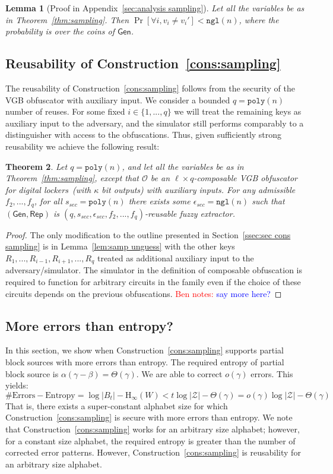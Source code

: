 \documentclass[11pt]{article}
\newcommand{\secref}[1]{\mbox{Section~\ref{#1}}}
\newcommand{\apref}[1]{\mbox{Appendix~\ref{#1}}}
\newcommand{\thref}[1]{\mbox{Theorem~\ref{#1}}}
\newcommand{\lemref}[1]{\mbox{Lemma~\ref{#1}}}
\newcommand{\consref}[1]{\mbox{Construction~\ref{#1}}}
\newcommand{\class}[1]{{\ensuremath{\mathsf{#1}}}}
\newcommand{\gen}{\ensuremath{\class{Gen}}\xspace}
\newcommand{\rep}{\ensuremath{\class{Rep}}\xspace}
\newcommand{\poly}{\ensuremath{\mathtt{poly}}\xspace}
\newcommand{\ngl}{\ensuremath{\mathtt{ngl}}\xspace}
\newcommand{\Hoo}{\mathrm{H}_\infty}
\newtheorem{theorem}{Theorem}[section]
\newtheorem{lemma}[theorem]{Lemma}
\newcommand{\authnote}[2]{{\textcolor{red}{\textsf{#1 notes: }\textcolor{blue}{ #2}}\marginpar{\textcolor{red}{\textbf{!!!!!}}}}}
\newcommand{\authnote}[2]{}
\newcommand{\bnote}[1]{{\authnote{Ben}{#1}}}
\begin{document}
\begin{lemma}[Proof in \apref{sec:analysis sampling}]
\label{lem:sampling errors}
Let all the variables be as in \thref{thm:sampling}.
 Then $\Pr[\forall i, v_i\neq v_i'] < \ngl(n)$, where the probability is over the coins of $\gen$.  
\end{lemma}

\subsection{Reusability of \consref{cons:sampling}}
The reusability of \consref{cons:sampling} follows from the security of the VGB obfuscator with auxiliary input.  We consider a bounded $q = \poly(n)$ number of reuses.  For some fixed $i\in \{1,..., q\}$ we will treat the remaining keys as auxiliary input to the adversary, and the simulator still performs comparably to a distinguisher with access to the obfuscations.  Thus, given sufficiently strong reusability we achieve the following result:

\begin{theorem}
\label{thm:reusability}
Let $q = \poly(n)$, and let all the variables be as in \thref{thm:sampling}, except that $\mathcal{O}$ be an $\ell\times q$-composable VGB obfuscator for digital lockers~(with $\kappa$ bit outputs) with auxiliary inputs.  For any admissible $f_2,..., f_q$, for all $s_{sec} = \poly(n)$ there exists some $\epsilon_{sec} = \ngl(n)$ such that $(\gen, \rep)$ is $(q, s_{sec}, \epsilon_{sec}, f_2,..., f_q)$-reusable fuzzy extractor.
\end{theorem}
\begin{proof}
The only modification to the outline presented in \secref{ssec:sec cons sampling} is in \lemref{lem:samp unguess} with the other keys $R_1,..., R_{i-1}, R_{i+1}, ..., R_q$ treated as additional auxiliary input to the adversary/simulator.  The simulator in the definition of composable obfuscation is required to function for arbitrary circuits in the family even if the choice of these circuits depends on the previous obfuscations.
\bnote{say more here?}
\end{proof}

\subsection{More errors than entropy?}
In this section, we show when \consref{cons:sampling} supports partial block sources with more errors than entropy.  The required entropy of partial block source is $\alpha (\gamma-\beta ) = \Theta(\gamma)$.  We are able to correct $o(\gamma)$ errors.
This yields:
\[
\text{\# Errors} - \text{Entropy} =  \log |B_t| -\Hoo(W) < t \log |\mathcal{Z}| - \Theta(\gamma)= o(\gamma) \log |\mathcal{Z}| - \Theta(\gamma)  
\]
That is, there exists a super-constant alphabet size for which \consref{cons:sampling} is secure with more errors than entropy.  We note that \consref{cons:sampling} works for an arbitrary size alphabet; however, for a constant size alphabet, the required entropy is greater than the number of corrected error patterns.  However, \consref{cons:sampling} is reusability for an arbitrary size alphabet.
\end{document}
